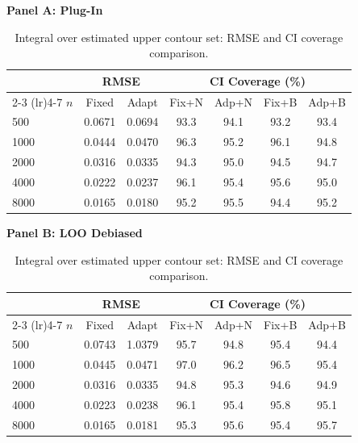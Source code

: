 \begin{table}[!h]
\centering
\small
\caption{Integral over estimated upper contour set: RMSE and CI coverage comparison.}
\label{tab:Sim2_Disk_Comp}
\vspace{0.3em}
\textbf{Panel A: Plug-In}
\begin{tabular}{lcccccc}
\hline\hline
 & \multicolumn{2}{c}{RMSE} & \multicolumn{4}{c}{CI Coverage (\%)} \\
\cmidrule(lr){2-3} \cmidrule(lr){4-7}
$n$ & Fixed & Adapt & Fix+N & Adp+N & Fix+B & Adp+B \\
\hline
500 & 0.0671 & 0.0694 & 93.3 & 94.1 & 93.2 & 93.4\\
1000 & 0.0444 & 0.0470 & 96.3 & 95.2 & 96.1 & 94.8\\
2000 & 0.0316 & 0.0335 & 94.3 & 95.0 & 94.5 & 94.7\\
4000 & 0.0222 & 0.0237 & 96.1 & 95.4 & 95.6 & 95.0\\
8000 & 0.0165 & 0.0180 & 95.2 & 95.5 & 94.4 & 95.2\\
\hline\hline
\end{tabular}
\vspace{0.3em}
\textbf{Panel B: LOO Debiased}
\begin{tabular}{lcccccc}
\hline\hline
 & \multicolumn{2}{c}{RMSE} & \multicolumn{4}{c}{CI Coverage (\%)} \\
\cmidrule(lr){2-3} \cmidrule(lr){4-7}
$n$ & Fixed & Adapt & Fix+N & Adp+N & Fix+B & Adp+B \\
\hline
500 & 0.0743 & 1.0379 & 95.7 & 94.8 & 95.4 & 94.4\\
1000 & 0.0445 & 0.0471 & 97.0 & 96.2 & 96.5 & 95.4\\
2000 & 0.0316 & 0.0335 & 94.8 & 95.3 & 94.6 & 94.9\\
4000 & 0.0223 & 0.0238 & 96.1 & 95.4 & 95.8 & 95.1\\
8000 & 0.0165 & 0.0181 & 95.3 & 95.6 & 95.4 & 95.7\\
\hline\hline
\end{tabular}
\end{table}
